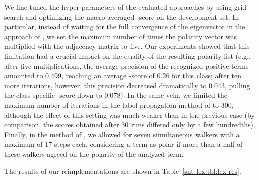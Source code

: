 We fine-tuned the hyper-parameters of the evaluated approaches by
using grid search and optimizing the macro-averaged \F{}-score on the
development set.  In particular, instead of waiting for the full
convergence of the eigenvector in the approach of
\citet{Blair-Goldensohn:08}, we set the maximum number of times the
polarity vector was multiplied with the adjacency matrix to five.  Our
experiments showed that this limitation had a crucial impact on the
quality of the resulting polarity list (e.g., after five
multiplications, the average precision of the recognized positive
terms amounted to 0.499, reaching an average \F{}-score of 0.26 for
this class; after ten more iterations, however, this precision
decreased dramatically to 0.043, pulling the class-specific \F{}-score
down to 0.078).  In the same vein, we limited the maximum number of
iterations in the label-propagation method of \citet{Rao:09} to 300,
although the effect of this setting was much weaker than in the
previous case (by comparison, the scores obtained after 30 runs
differed only by a few hundredths).  Finally, in the method of
\citet{Awadallah:10}, we allowed for seven simultaneous walkers with a
maximum of 17 steps each, considering a term as polar if more than a
half of these walkers agreed on the polarity of the analyzed term.

The results of our reimplementations are shown in
Table~\ref{snt-lex:tbl:lex-res}.

